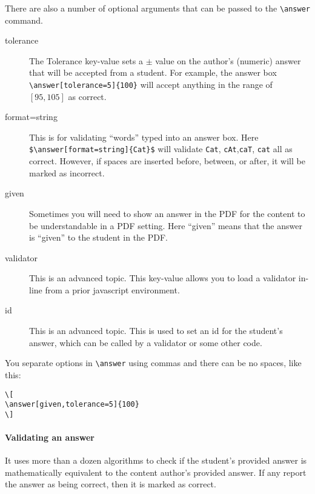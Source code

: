 \documentclass{ximera}
\begin{document}
There are also a number of optional arguments that can be passed
to the \verb|\answer| command.
\begin{description}
  \item[tolerance] The Tolerance key-value sets a $\pm$ value on the
    author's (numeric) answer that will be accepted from a student. For
    example,
    the answer box \verb|\answer[tolerance=5]{100}| will accept anything in
    the range of $[95,105]$ as correct.
  \item[format=string] This is for validating ``words'' typed into an answer
    box. Here
    \verb|$\answer[format=string]{Cat}$| will validate \verb!Cat!,
    \verb!cAt!,\verb!caT!, \verb!cat! all as
    correct. However, if spaces are inserted before, between, or after, it will
    be marked as incorrect.
  \item[given] Sometimes you will need to show an answer in the PDF for the
    content to be understandable in a PDF setting. Here ``given'' means that
    the
    answer is ``given'' to the student in the PDF.
  \item[validator] This is an advanced topic. This key-value allows you to load
    a validator in-line
    from a prior javascript environment.
  \item[id] This is an advanced topic. This is used to set an id for the
    student's answer, which can be
    called by a validator or some other code.
\end{description}

\begin{warning}
  You separate options in \verb!\answer! using commas and there can be no spaces, like this:
\begin{verbatim}
\[
\answer[given,tolerance=5]{100}
\]
\end{verbatim}
\end{warning}



\paragraph{Validating an answer}

It uses more than a dozen algorithms to check if the student's provided answer
is mathematically equivalent to the content author's provided answer. If any
report the answer as being correct, then it is marked as correct.
\end{document}
